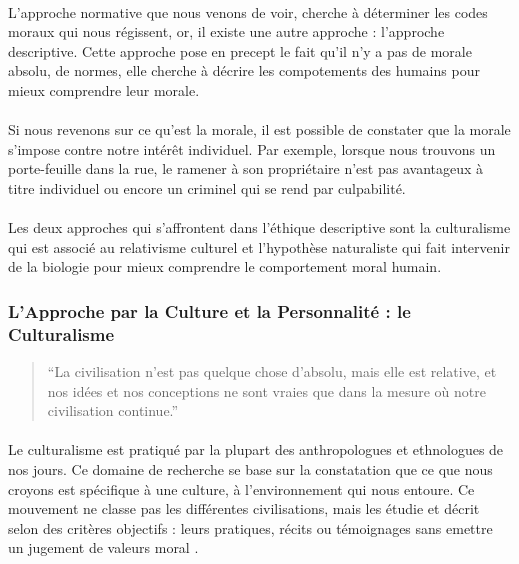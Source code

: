 \documentclass[10pt, french, a4paper]{report}
\begin{document}
\paragraph{}
L'approche normative que nous venons de voir, cherche à déterminer les codes moraux qui nous régissent, or, il existe une autre approche : l'approche descriptive. Cette approche pose en precept le fait qu'il n'y a pas de morale absolu, de normes, elle cherche à décrire les compotements des humains pour mieux comprendre leur morale.

\paragraph{}
Si nous revenons sur ce qu'est la morale, il est possible de constater que la morale s'impose contre notre intérêt individuel. Par exemple, lorsque nous trouvons un porte-feuille dans la rue, le ramener à son propriétaire n'est pas avantageux à titre individuel ou encore un criminel qui se rend par culpabilité.

\paragraph{}
Les deux approches qui s'affrontent dans l'éthique descriptive sont la culturalisme qui est associé au relativisme culturel et l'hypothèse naturaliste qui fait intervenir de la biologie pour mieux comprendre le comportement moral humain.

\subsubsection{L'Approche par la Culture et la Personnalité : le Culturalisme}

\begin{quotation}
  ``La civilisation n'est pas quelque chose d'absolu, mais elle est relative, et nos idées et nos conceptions ne sont vraies que dans la mesure où notre  civilisation continue.''
  \end{quotation}

\paragraph{}
Le culturalisme est pratiqué par la plupart des anthropologues et ethnologues de nos jours. Ce domaine de recherche se base sur la constatation que ce que nous croyons est spécifique à une culture, à l'environnement qui nous entoure. Ce mouvement ne classe pas les différentes civilisations, mais les étudie et décrit selon des critères objectifs : leurs pratiques, récits ou témoignages sans emettre un jugement de valeurs moral \citep{servier_methode_1993}.
\end{document}
